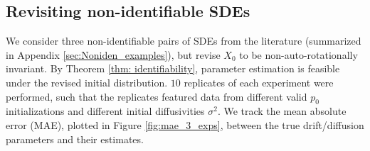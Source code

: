 \documentclass[twoside,11pt]{article}
\begin{document}
\subsection{Revisiting non-identifiable SDEs}
\label{sec: revisit_SDEs}
We consider three non-identifiable pairs of SDEs from the literature (summarized in Appendix \ref{sec:Noniden_examples}), but revise $X_0$ to be non-auto-rotationally invariant. By Theorem \ref{thm: identifiability}, parameter estimation is feasible under the revised initial distribution. $10$ replicates of each experiment were performed, such that the replicates featured data from different valid $p_0$ initializations and different initial diffusivities $\sigma^2$. We track the mean absolute error (MAE), plotted in Figure \ref{fig:mae_3_exps}, between the true drift/diffusion parameters and their estimates.
\end{document}
